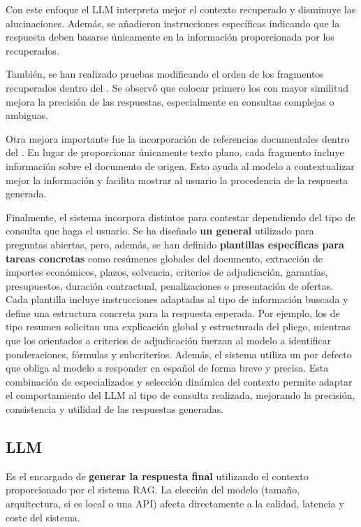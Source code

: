 Con este enfoque el LLM interpreta mejor el contexto recuperado y disminuye las alucinaciones. Además, se añadieron instrucciones específicas indicando que la respuesta deben basarse únicamente en la información proporcionada por los  recuperados.

También, se han realizado pruebas modificando el orden de los fragmentos recuperados dentro del . Se observó que colocar primero los  con mayor similitud mejora la precisión de las respuestas, especialmente en consultas complejas o ambiguas.

Otra mejora importante fue la incorporación de referencias documentales dentro del . En lugar de proporcionar únicamente texto plano, cada fragmento incluye información sobre el documento de origen. Esto ayuda al modelo a contextualizar mejor la información y facilita mostrar al usuario la procedencia de la respuesta generada.

Finalmente, el sistema incorpora distintos  para contestar dependiendo del tipo de consulta que haga el usuario. Se ha diseñado \textbf{un  general} utilizado para preguntas abiertas, pero, además, se han definido \textbf{plantillas específicas para tareas concretas} como resúmenes globales del documento, extracción de importes económicos, plazos, solvencia, criterios de adjudicación, garantías, presupuestos, duración contractual, penalizaciones o presentación de ofertas. Cada plantilla incluye instrucciones adaptadas al tipo de información buscada y define una estructura concreta para la respuesta esperada. Por ejemplo, los  de tipo resumen solicitan una explicación global y estructurada del pliego, mientras que los orientados a criterios de adjudicación fuerzan al modelo a identificar ponderaciones, fórmulas y subcriterios. Además, el sistema utiliza un  por defecto que obliga al modelo a responder en español de forma breve y precisa. Esta combinación de  especializados y selección dinámica del contexto permite adaptar el comportamiento del LLM al tipo de consulta realizada, mejorando la precisión, consistencia y utilidad de las respuestas generadas.

\subsection{LLM}

Es el encargado de \textbf{generar la respuesta final} utilizando el contexto proporcionado por el sistema RAG. La elección del modelo (tamaño, arquitectura, si es local o una API) afecta directamente a la calidad, latencia y coste del sistema.

